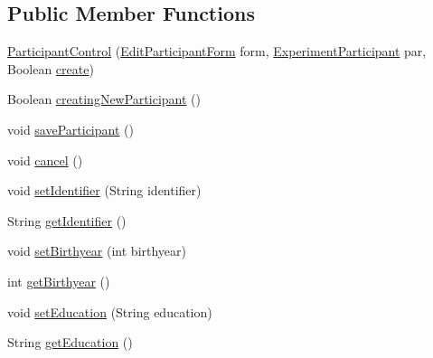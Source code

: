 \subsection*{Public Member Functions}
\begin{DoxyCompactItemize}
\item 
\hyperlink{class_web_analyzer_1_1_u_i_1_1_interaction_objects_1_1_participant_control_acbbf6818f36ccddc69c2e0676616a9d9}{Participant\+Control} (\hyperlink{class_web_analyzer_1_1_u_i_1_1_edit_participant_form}{Edit\+Participant\+Form} form, \hyperlink{class_web_analyzer_1_1_models_1_1_base_1_1_experiment_participant}{Experiment\+Participant} par, Boolean \hyperlink{_u_i_2_h_t_m_l_resources_2js_2lib_2underscore_8min_8js_a8bd5981157799459d39a59e8c4a0de04}{create})
\item 
Boolean \hyperlink{class_web_analyzer_1_1_u_i_1_1_interaction_objects_1_1_participant_control_a7322f5b6846c152c3839627dd76499a5}{creating\+New\+Participant} ()
\item 
void \hyperlink{class_web_analyzer_1_1_u_i_1_1_interaction_objects_1_1_participant_control_ab90ab2f4742cf71d9794493a829b0761}{save\+Participant} ()
\item 
void \hyperlink{class_web_analyzer_1_1_u_i_1_1_interaction_objects_1_1_participant_control_ab0eb72538ef9ab71a0ba4e62ccd9b248}{cancel} ()
\item 
void \hyperlink{class_web_analyzer_1_1_u_i_1_1_interaction_objects_1_1_participant_control_ac3070d10033a596ae93ed517350eaa77}{set\+Identifier} (String identifier)
\item 
String \hyperlink{class_web_analyzer_1_1_u_i_1_1_interaction_objects_1_1_participant_control_a6c34cb14cd2906b04e14781cb323c09a}{get\+Identifier} ()
\item 
void \hyperlink{class_web_analyzer_1_1_u_i_1_1_interaction_objects_1_1_participant_control_a7ee9d12140bd3267295398c59341c332}{set\+Birthyear} (int birthyear)
\item 
int \hyperlink{class_web_analyzer_1_1_u_i_1_1_interaction_objects_1_1_participant_control_abb724cd0dd15e40e4b5df261eb04a8a5}{get\+Birthyear} ()
\item 
void \hyperlink{class_web_analyzer_1_1_u_i_1_1_interaction_objects_1_1_participant_control_a155f2c7193f63292b9db9cba519a6b91}{set\+Education} (String education)
\item 
String \hyperlink{class_web_analyzer_1_1_u_i_1_1_interaction_objects_1_1_participant_control_a9e0ff1066116a72e21146a8132c5c6f2}{get\+Education} ()
\item 

\end{DoxyCompactItemize}
